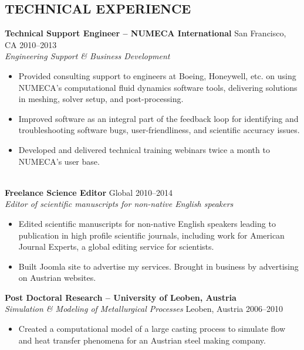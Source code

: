\documentclass[11pt]{res} %
\begin{document}
\begin{resume}
\section{TECHNICAL EXPERIENCE} 
\vspace{4pt}
\textbf{Technical Support Engineer -- NUMECA International} \hfill  San Francisco, CA 2010--2013\\
\textit{ Engineering Support \& Business Development}
\vspace{2pt}
\begin{itemize} \itemsep -1pt 
	\item Provided consulting support to engineers at Boeing, Honeywell, etc. on using NUMECA's computational fluid dynamics software tools, delivering solutions in meshing, solver setup, and post-processing. 
	\item Improved software as an integral part of the feedback loop for identifying and troubleshooting software bugs, user-friendliness, and scientific accuracy issues.
	\item Developed and delivered technical training webinars twice a month to NUMECA's user base. 
\end{itemize}
\vspace{10pt}\\
\textbf{Freelance Science Editor}              \hfill Global 2010--2014\\
\textit {Editor of scientific manuscripts for non-native English speakers}
\vspace{2pt}
\begin{itemize} \itemsep -1pt 
  \item Edited scientific manuscripts for non-native English speakers leading to publication in high profile scientific journals, including work for American Journal Experts, a global editing service for scientists.
    \item Built Joomla site to advertise my services. Brought in business by advertising on Austrian websites. 
\end{itemize}
%
\vspace{-8pt}
\textbf{Post Doctoral Research -- University of Leoben, Austria} \\
\textit{Simulation \& Modeling of Metallurgical Processes} \hfill  Leoben, Austria 2006--2010
\vspace{2pt}
\begin{itemize} \itemsep -1pt  %
\item Created a computational model of a large casting process to simulate flow and heat transfer phenomena for an Austrian steel making company.

\end{itemize}
\end{resume}
\end{document}
